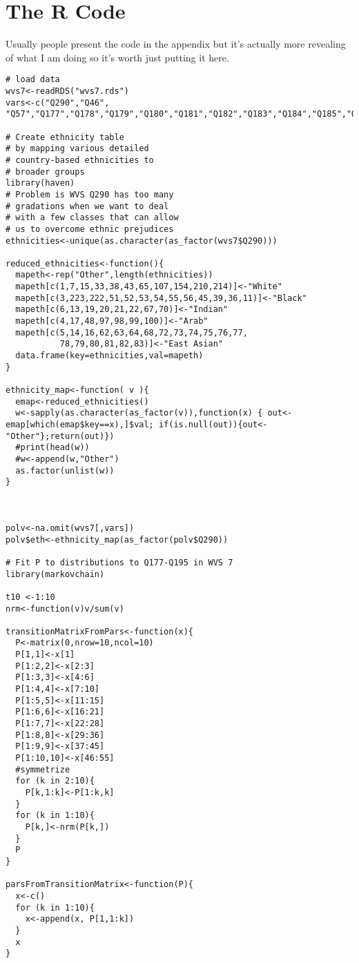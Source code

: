 \documentclass{amsart}
\begin{document}
\section{The R Code}

Usually people present the code in the appendix but it's actually more revealing of what I am doing so it's worth just putting it here.

\begin{verbatim}
# load data
wvs7<-readRDS("wvs7.rds")
vars<-c("Q290","Q46", "Q57","Q177","Q178","Q179","Q180","Q181","Q182","Q183","Q184","Q185","Q186","Q187","Q188","Q189","Q190","Q191","Q192","Q193","Q194","Q195","Q275","Q192")

# Create ethnicity table 
# by mapping various detailed
# country-based ethnicities to
# broader groups
library(haven)
# Problem is WVS Q290 has too many 
# gradations when we want to deal 
# with a few classes that can allow 
# us to overcome ethnic prejudices
ethnicities<-unique(as.character(as_factor(wvs7$Q290)))

reduced_ethnicities<-function(){
  mapeth<-rep("Other",length(ethnicities))
  mapeth[c(1,7,15,33,38,43,65,107,154,210,214)]<-"White"
  mapeth[c(3,223,222,51,52,53,54,55,56,45,39,36,11)]<-"Black"
  mapeth[c(6,13,19,20,21,22,67,70)]<-"Indian"
  mapeth[c(4,17,48,97,98,99,100)]<-"Arab"
  mapeth[c(5,14,16,62,63,64,68,72,73,74,75,76,77,
           78,79,80,81,82,83)]<-"East Asian"
  data.frame(key=ethnicities,val=mapeth)
}

ethnicity_map<-function( v ){
  emap<-reduced_ethnicities()
  w<-sapply(as.character(as_factor(v)),function(x) { out<-emap[which(emap$key==x),]$val; if(is.null(out)){out<-"Other"};return(out)})
  #print(head(w))
  #w<-append(w,"Other")
  as.factor(unlist(w))
}



polv<-na.omit(wvs7[,vars])
polv$eth<-ethnicity_map(as_factor(polv$Q290))

# Fit P to distributions to Q177-Q195 in WVS 7
library(markovchain)

t10 <-1:10
nrm<-function(v)v/sum(v)

transitionMatrixFromPars<-function(x){
  P<-matrix(0,nrow=10,ncol=10)
  P[1,1]<-x[1]
  P[1:2,2]<-x[2:3]
  P[1:3,3]<-x[4:6]
  P[1:4,4]<-x[7:10]
  P[1:5,5]<-x[11:15]
  P[1:6,6]<-x[16:21]
  P[1:7,7]<-x[22:28]
  P[1:8,8]<-x[29:36]
  P[1:9,9]<-x[37:45]
  P[1:10,10]<-x[46:55]
  #symmetrize
  for (k in 2:10){
    P[k,1:k]<-P[1:k,k]
  }
  for (k in 1:10){
    P[k,]<-nrm(P[k,])
  }
  P
}

parsFromTransitionMatrix<-function(P){
  x<-c()
  for (k in 1:10){
    x<-append(x, P[1,1:k])
  }
  x
}


\end{verbatim}
\end{document}
